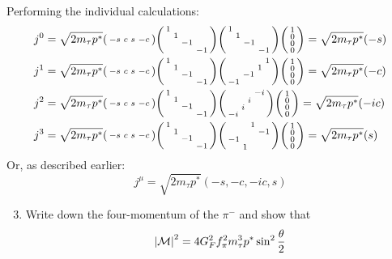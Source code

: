 \documentclass[12pt]{article}
\newcommand{\M}{\mathcal{M}}
\begin{document}
Performing the individual calculations:
\begin{align*}
  j^0&=\sqrt{2m_\tau p^*}\spmqty{-s&c&s&-c}
  \spmqty{1\\&1\\&&-1\\&&&-1}\spmqty{1\\&1\\&&-1\\&&&-1}
  \spmqty{1\\0\\0\\0}=\sqrt{2m_\tau p^*}(-s)\\
  j^1&=\sqrt{2m_\tau p^*}\spmqty{-s&c&s&-c}
  \spmqty{1\\&1\\&&-1\\&&&-1}\spmqty{&&&1\\&&1\\&-1\\-1}
  \spmqty{1\\0\\0\\0}=\sqrt{2m_\tau p^*}(-c)\\
  j^2&=\sqrt{2m_\tau p^*}\spmqty{-s&c&s&-c}
  \spmqty{1\\&1\\&&-1\\&&&-1}\spmqty{&&&-i\\&&i\\&i\\-i}
  \spmqty{1\\0\\0\\0}=\sqrt{2m_\tau p^*}(-ic)\\
  j^3&=\sqrt{2m_\tau p^*}\spmqty{-s&c&s&-c}
  \spmqty{1\\&1\\&&-1\\&&&-1}\spmqty{&&1\\&&&-1\\-1\\&1}
  \spmqty{1\\0\\0\\0}=\sqrt{2m_\tau p^*}(s)
\end{align*}
Or, as described earlier:
\begin{equation}
  \label{eq:p5b}
  \boxed{j^\mu=\sqrt{2m_\tau p^*}(-s,-c,-ic,s)}
\end{equation}
\begin{problem}
  \begin{enumerate}[label = (\alph*)]
    \setcounter{enumi}{2}
  \item Write down the four-momentum of the $\pi^-$ and  show that
    \begin{align*}
      \abs{\M}^2=4G_F^2f_\pi^2m_\tau^3p^*\sin^2\frac\theta2
    \end{align*}
  \end{enumerate}
\end{problem}
\end{document}
